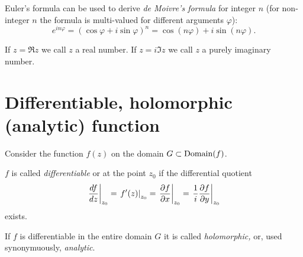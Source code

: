 Euler's formula can be used to derive {\em de Moivre's formula}
 for integer $n$ (for non-integer $n$ the formula is multi-valued for different arguments $\varphi$):
\begin{equation}
e^{in\varphi} = (\cos \varphi +i \sin \varphi )^n      = \cos (n\varphi) +i \sin (n\varphi).
\end{equation}

If  $z = \Re z $ we call $z$ a real number.
If  $z = i\Im z $ we call $z$ a purely imaginary number.

 \section{Differentiable, holomorphic (analytic) function}
Consider the function $f(z)$ on the domain $G\subset {\rm Domain}(f)$.

$f$
is called {\em differentiable} or at the point $z_0$ if the  differential quotient
\begin{equation}
\left. {df\over dz}\right|_{z_0}=
\left. f'(z)\right|_{z_0} =
\left. {\partial f\over \partial  x}\right|_{z_0} =
\left. {1\over i}{\partial f\over \partial y}\right|_{z_0}
\end{equation}
 exists.

If $f$ is differentiable in the entire domain $G$ it is called {\em holomorphic,}
or, used synonymuously, {\em analytic}.





